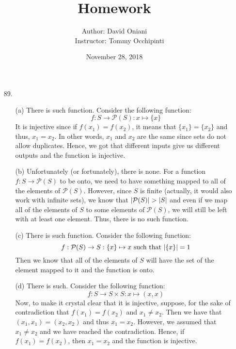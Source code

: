 \documentclass[12pt, a4paper]{article}
\title{\bf{Homework \textnumero 13}}
\author{Author: David Oniani
\\
\ \ \ Instructor: Tommy Occhipinti}
\date{November 28, 2018}
\DeclarePairedDelimiter\abs{\lvert}{\rvert}
\newcommand{\rarr}{\rightarrow}
\begin{document}
\maketitle
\begin{itemize}

\item[89.]
\begin{itemize}
\item[(a)]
There is such function. Consider the following function:
$$f : S \rarr \mathcal{P}(S) : x \mapsto \{x\}$$
It is injective since if $f(x_1) = f(x_2)$, it means that $\{x_1\} = \{x_2\}$
and thus, $x_1 = x_2$. In other words, $x_1$ and $x_2$ are the same since sets do not
allow duplicates. Hence, we got that different inputs give us different outputs and the
function is injective.

\item[]

\item[(b)]
Unfortunately (or fortunately), there is none. For a function $f : S \rarr \mathcal{P}(S)$
to be onto, we need to have something mapped to all of the elements of $\mathcal{P}(S)$.
However, since $S$ is finite (actually, it would also work with infinite sets), we know that $\abs{\mathcal{P}(S)} > \abs{S}$ and even if
we map all of the elements of $S$ to some elements of $\mathcal{P}(S)$, we will still be left
with at least one element. Thus, there is no such function.

\item[]

\item[(c)]
There is such function. Consider the following function:
$$f : \mathcal{P}(S) \rarr S : \{x\} \mapsto x \mbox{ such that } \abs{\{x\}} = 1$$
Then we know that all of the elements of $S$ will have the set of the element
mapped to it and the function is onto.

\item[]

\item[(d)]
There is such. Consider the following function:
$$f : S \rarr S \times S : x \mapsto (x, x)$$
Now, to make it crystal clear that it is injective, suppose, for the sake
of contradiction that $f(x_1) = f(x_2)$ and $x_1 \neq x_2$. Then we have that
$(x_1, x_1) = (x_2, x_2)$ and thus $x_1 = x_2$. However, we assumed that $x_1 \neq x_2$
and we have reached the contradiction. Hence, if $f(x_1) = f(x_2)$, then $x_1 = x_2$
and the function is injective.

\item[]


\end{itemize}
\end{itemize}
\end{document}
